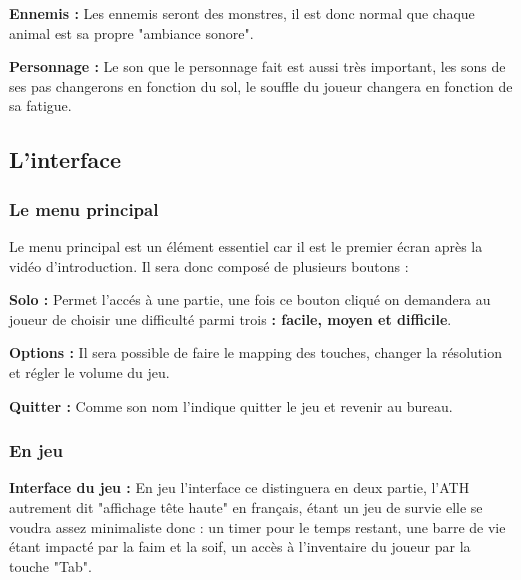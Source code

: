 \documentclass{article}
\begin{document}
\par
\textbf{Ennemis :} Les ennemis seront des monstres, il est donc normal que chaque animal est sa propre "ambiance sonore".
\newline

\par
\textbf{Personnage :} Le son que le personnage fait est aussi très important, les sons de ses pas changerons en fonction du sol, le souffle du joueur changera en fonction de sa fatigue.
\newline

\subsection{L'interface}

\subsubsection{Le menu principal}

\par
Le menu principal est un élément essentiel car il est le premier écran après la vidéo d'introduction. Il sera donc composé de plusieurs boutons :
\newline

\par
\textbf{Solo :} Permet l'accés à une partie, une fois ce bouton cliqué on demandera au joueur de choisir une difficulté parmi trois \textbf{: facile, moyen et difficile}.
\newline

\par
\textbf{Options :} Il sera possible de faire le mapping des touches, changer la résolution et régler le volume du jeu.
\newline

\par
\textbf{Quitter :} Comme son nom l'indique quitter le jeu et revenir au bureau.
\newline

\subsubsection{En jeu}

\par

\textbf{Interface du jeu :} En jeu l'interface ce distinguera en deux partie, l'ATH autrement dit "affichage tête haute" en français, étant un jeu de survie elle se voudra assez minimaliste donc : un timer pour le temps restant, une barre de vie étant impacté par la faim et la soif, un accès à l'inventaire du joueur par la touche "Tab". 
\newline
\end{document}
